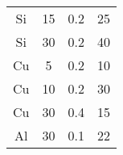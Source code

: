 \begin{table}[ht]
\begin{tabular}{cccc}
        Si     & 15                          & 0.2                          & 25             \\
        Si     & 30                          & 0.2                          & 40             \\
        Cu     & 5                           & 0.2                          & 10             \\
        Cu     & 10                          & 0.2                          & 30             \\
        Cu     & 30                          & 0.4                          & 15             \\
        Al     & 30                          & 0.1                          & 22
    \end{tabular}
\end{table}